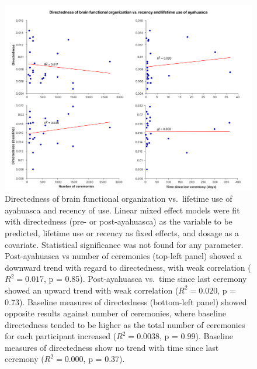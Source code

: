 \begin{figure}[h!]
    \centering
    \includegraphics[width=\textwidth]{images/Figure 6_ Correlations between recency.png}
    \caption[Directedness of brain functional organization vs. lifetime use and recency of use.]{Directedness of brain functional organization vs.~lifetime use of
ayahuasca and recency of use. Linear mixed effect models were fit with
directedness (pre- or post-ayahuasca) as the variable to be predicted,
lifetime use or recency as fixed effects, and dosage as a covariate.
Statistical significance was not found for any parameter. Post-ayahuasca
vs number of ceremonies (top-left panel) showed a downward trend with
regard to directedness, with weak correlation (\(R^2=0.017\), p = 0.85).
Post-ayahuasca vs.~time since last ceremony showed an upward trend with
weak correlation (\(R^2=0.020\), p = 0.73). Baseline measures of directedness
(bottom-left panel) showed opposite results against number of
ceremonies, where baseline directedness tended to be higher as the total
number of ceremonies for each participant increased (\(R^2=0.0038\), p = 0.99).
Baseline measures of directedness show no trend with time since last
ceremony (\(R^2=0.000\), p = 0.37).}
    \label{fig:corr}
\end{figure}


